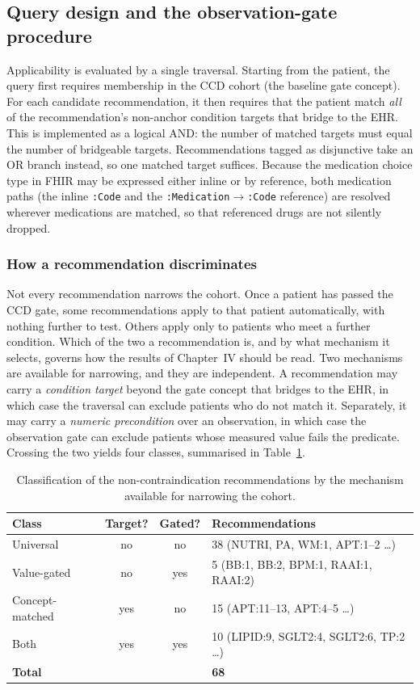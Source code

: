 \subsection{Query design and the observation-gate procedure}
Applicability is evaluated by a single traversal. Starting from the patient, the query first
requires membership in the CCD cohort (the baseline gate concept). For each candidate
recommendation, it then requires that the patient match \emph{all} of the recommendation's
non-anchor condition targets that bridge to the EHR. This is implemented as a logical AND:
the number of matched targets must equal the number of bridgeable targets. Recommendations
tagged as disjunctive take an OR branch instead, so one matched target suffices. Because the
medication choice type in FHIR may be expressed either inline or by reference, both
medication paths (the inline \texttt{:Code} and the \texttt{:Medication}$\to$\texttt{:Code}
reference) are resolved wherever medications are matched, so that referenced drugs are not
silently dropped.

\subsubsection*{How a recommendation discriminates}
\label{sec:disc-class}
Not every recommendation narrows the cohort. Once a patient has passed the CCD gate, some recommendations apply to that patient
automatically, with nothing further to test. Others apply only to patients who meet a
further condition. Which of the two a recommendation is, and by what mechanism it selects,
governs how the results of Chapter~IV should be read. Two mechanisms are available for
narrowing, and they are independent. A recommendation may carry a \emph{condition target}
beyond the gate concept that bridges to the EHR, in which case the traversal can exclude
patients who do not match it. Separately, it may carry a \emph{numeric precondition} over an
observation, in which case the observation gate can exclude patients whose measured value
fails the predicate. Crossing the two yields four classes, summarised in
Table~\ref{tab:disc-class}.

\begin{table}[h]
\centering
\caption{Classification of the non-contraindication recommendations by the mechanism
available for narrowing the cohort.}
\label{tab:disc-class}
\begin{tabular}{lccl}
\hline
\textbf{Class} & \textbf{Target?} & \textbf{Gated?} & \textbf{Recommendations} \\
\hline
Universal        & no  & no  & 38 \quad (NUTRI, PA, WM:1, APT:1--2 \ldots) \\
Value-gated      & no  & yes & \phantom{0}5 \quad (BB:1, BB:2, BPM:1, RAAI:1, RAAI:2) \\
Concept-matched  & yes & no  & 15 \quad (APT:11--13, APT:4--5 \ldots) \\
Both             & yes & yes & 10 \quad (LIPID:9, SGLT2:4, SGLT2:6, TP:2 \ldots) \\
\hline
\textbf{Total}   &     &     & \textbf{68} \\
\hline
\end{tabular}
\end{table}

